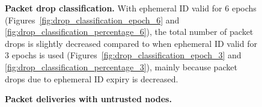\documentclass[11pt]{article}
\begin{document}
\begin{figure}[h!]
{\label{fig:drop_classification_percentage_6}
}
\caption{{\bf Packet drop classification.}
With ephemeral ID valid for 6 epochs (Figures~\ref{fig:drop_classification_epoch_6} and \ref{fig:drop_classification_percentage_6}),  
the total number of packet drops is slightly decreased compared to when ephemeral ID valid for 3 epochs is used (Figures~\ref{fig:drop_classification_epoch_3} and \ref{fig:drop_classification_percentage_3}), mainly because packet drops due to ephemeral ID expiry is decreased.
}
\label{fig:drop_classification}
\end{figure}






\begin{figure}[t!]
\center
{}
\hfill
{}
\caption{{\bf Packet deliveries with untrusted nodes.}}
\label{fig:delivery_count}
\end{figure}
\end{document}
